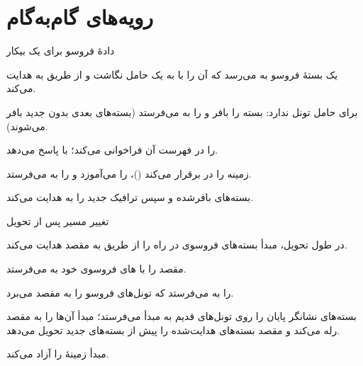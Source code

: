 \documentclass[11pt,a4paper]{article}
\begin{document}
\section{رویه‌های گام‌به‌گام}

\begin{procedurebox}{دادهٔ فروسو برای یک  بیکار}\label{proc:ddn}
\begin{steps}
  \item یک بستهٔ فروسو به  می‌رسد که آن را با  به یک حامل نگاشت و از طریق  به 
        هدایت می‌کند.
  \item {} برای حامل تونل  ندارد: بسته را بافر و  را به  می‌فرستد
        (بسته‌های بعدی بدون  جدید بافر می‌شوند).
  \item {}  را در فهرست  آن فراخوانی می‌کند؛  با  پاسخ می‌دهد.
  \item {} زمینه را در  برقرار می‌کند ()،   را می‌آموزد و
         را به  می‌فرستد.
  \item {} بسته‌های بافرشده و سپس ترافیک جدید را به  هدایت می‌کند.
\end{steps}
\end{procedurebox}

\begin{acnfigure}
  \caption{درخواست خدمت آغازشده از شبکه با بافرکردن در  (\cref{proc:ddn}).}
  \label{fig:ddn}
\end{acnfigure}

\begin{procedurebox}{تغییر مسیر پس از تحویل }\label{proc:switch}
\begin{steps}
  \item در طول تحویل،  مبدأ بسته‌های فروسوی در راه را از طریق  به  مقصد هدایت می‌کند.
  \item {} مقصد  را با های فروسوی خود به  می‌فرستد.
  \item {}  را به  می‌فرستد که تونل‌های فروسو را به مقصد می‌برد.
  \item {} بسته‌های نشانگر پایان را روی تونل‌های قدیم به  مبدأ می‌فرستد؛ مبدأ آن‌ها را به مقصد رله می‌کند
        و مقصد بسته‌های هدایت‌شده را پیش از بسته‌های جدید تحویل می‌دهد.
  \item {} مبدأ زمینهٔ  را آزاد می‌کند.
\end{steps}
\end{procedurebox}
\end{document}
